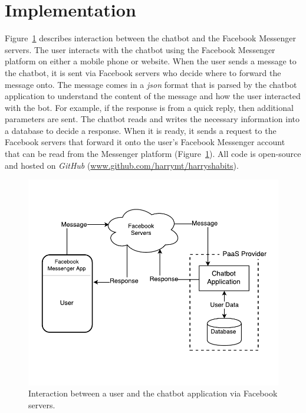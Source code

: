 
\section{Implementation}
Figure~\ref{fig:prototype_component_overview} describes interaction between the chatbot and the Facebook Messenger servers. The user interacts with the chatbot using the Facebook Messenger platform on either a mobile phone or website. When the user sends a message to the chatbot, it is sent via Facebook servers who decide where to forward the message onto. The message comes in a \textit{json} format that is parsed by the chatbot application to understand the content of the message and how the user interacted with the bot. For example, if the response is from a quick reply, then additional parameters are sent. The chatbot reads and writes the necessary information into a database to decide a response. When it is ready, it sends a request to the Facebook servers that forward it onto the user's Facebook Messenger account that can be read from the Messenger platform (Figure~\ref{fig:prototype_component_overview}). All code is open-source and hosted on \textit{GitHub} (\url{www.github.com/harrymt/harryshabits}).

\begin{figure}[H]
    \centering
    \includegraphics[width=5.1in]{../resources/diagrams/chatbot-component-overview.pdf}
    \caption{Interaction between a user and the chatbot application via Facebook servers.}
    \label{fig:prototype_component_overview}
\end{figure}

